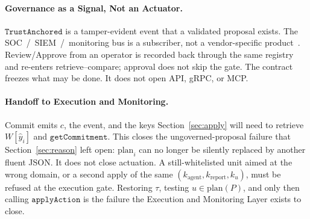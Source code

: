 \paragraph{Governance as a Signal, Not an Actuator.}
$\mathtt{TrustAnchored}$ is a tamper-evident event that a validated proposal exists. The SOC~/~SIEM~/~monitoring bus is a subscriber, not a vendor-specific product~\cite{chen2024,jin2024}. Review/Approve from an operator is recorded back through the same registry and re-enters retrieve--compare; approval does not skip the gate. The contract freezes what may be done. It does not open API, gRPC, or MCP.

\paragraph{Handoff to Execution and Monitoring.}
Commit emits $c$, the event, and the keys Section~\ref{sec:apply} will need to retrieve $W[\hat{y}_i]$ and $\mathtt{getCommitment}$. This closes the ungoverned-proposal failure that Section~\ref{sec:reason} left open: $\mathrm{plan}_i$ can no longer be silently replaced by another fluent JSON. It does not close actuation. A still-whitelisted unit aimed at the wrong domain, or a second apply of the same $(k_{\mathrm{agent}},k_{\mathrm{report}},k_u)$, must be refused at the execution gate. Restoring $\tau$, testing $u\in\mathrm{plan}(P)$, and only then calling $\mathtt{applyAction}$ is the failure the Execution and Monitoring Layer exists to close.
